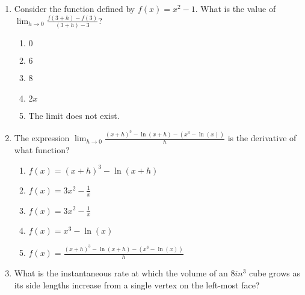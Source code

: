 \documentclass[12pt]{report}
\begin{document}
\begin{enumerate}

\item Consider the function defined by $f(x) = x^2 - 1$. What is the value of $ \lim_{h \to 0}\frac{f(3+h)-f(3)}{(3+h)-3}$?

\begin{enumerate}

\item $0$

\item $6$

\item 8

\item $2x$

\item The limit does not exist.

\end{enumerate}

\item The expression $\lim_{h \to 0}\frac{(x+h)^3-\ln(x+h) - \left(x^3-\ln(x)\right)}{h}$ is the derivative of what function?

\begin{enumerate}

\item $f(x) = (x+h)^3-\ln(x+h)$

\item $f(x) = 3x^2 - \frac{1}{x}$

\item $f(x) = 3x^2 - \frac{1}{x}$

\item $f(x) = x^3 - \ln(x)$

\item $f(x) = \frac{(x+h)^3-\ln(x+h) - \left(x^3-\ln(x)\right)}{h}$

\end{enumerate}

\item What is the instantaneous rate at which the volume of an $8in^3$ cube grows as its side lengths increase from a single vertex on the left-most face?



\end{enumerate}
\end{document}
